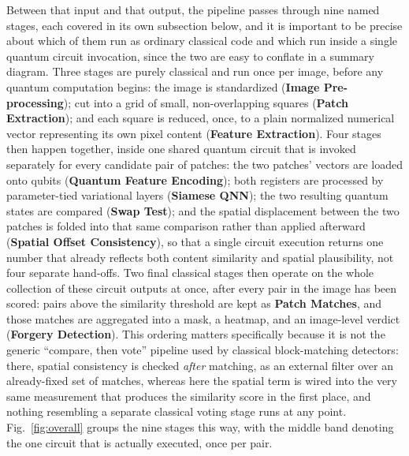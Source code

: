\documentclass[conference]{IEEEtran}
\begin{document}
Between that input and that output, the pipeline passes through nine named stages, each covered in its own subsection below, and it is important to be precise about which of them run as ordinary classical code and which run inside a single quantum circuit invocation, since the two are easy to conflate in a summary diagram. Three stages are purely classical and run once per image, before any quantum computation begins: the image is standardized (\textbf{Image Pre-processing}); cut into a grid of small, non-overlapping squares (\textbf{Patch Extraction}); and each square is reduced, once, to a plain normalized numerical vector representing its own pixel content (\textbf{Feature Extraction}). Four stages then happen together, inside one shared quantum circuit that is invoked separately for every candidate pair of patches: the two patches' vectors are loaded onto qubits (\textbf{Quantum Feature Encoding}); both registers are processed by parameter-tied variational layers (\textbf{Siamese QNN}); the two resulting quantum states are compared (\textbf{Swap Test}); and the spatial displacement between the two patches is folded into that same comparison rather than applied afterward (\textbf{Spatial Offset Consistency}), so that a single circuit execution returns one number that already reflects both content similarity and spatial plausibility, not four separate hand-offs. Two final classical stages then operate on the whole collection of these circuit outputs at once, after every pair in the image has been scored: pairs above the similarity threshold are kept as \textbf{Patch Matches}, and those matches are aggregated into a mask, a heatmap, and an image-level verdict (\textbf{Forgery Detection}). This ordering matters specifically because it is not the generic ``compare, then vote'' pipeline used by classical block-matching detectors: there, spatial consistency is checked \emph{after} matching, as an external filter over an already-fixed set of matches, whereas here the spatial term is wired into the very same measurement that produces the similarity score in the first place, and nothing resembling a separate classical voting stage runs at any point. Fig.~\ref{fig:overall} groups the nine stages this way, with the middle band denoting the one circuit that is actually executed, once per pair.
\end{document}
